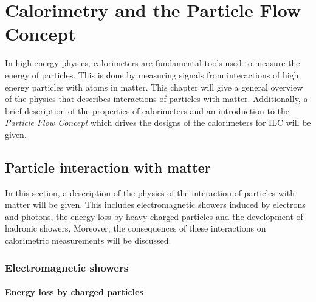 \chapter{Calorimetry and the Particle Flow Concept}
\label{chap:CaloPFA}

In high energy physics, calorimeters are fundamental tools used to measure the energy of particles. This is done by measuring signals from interactions of high energy particles with atoms in matter. This chapter will give a general overview of the physics that describes interactions of particles with matter. Additionally, a brief description of the properties of calorimeters and an introduction to the \textit{Particle Flow Concept} which drives the designs of the calorimeters for ILC will be given.

\section{Particle interaction with matter}
\label{sec:PartInter}

In this section, a description of the physics of the interaction of particles with matter will be given. This includes electromagnetic showers induced by electrons and photons, the energy loss by heavy charged particles and the development of hadronic showers. Moreover, the consequences of these interactions on calorimetric measurements will be discussed.

\subsection{Electromagnetic showers}
\label{subsec:EMShowers}

\subsubsection{Energy loss by charged particles}

